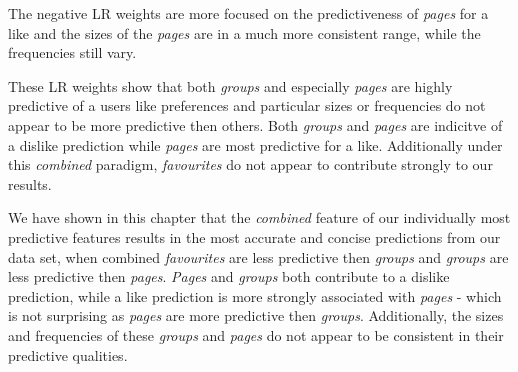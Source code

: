 The negative LR weights are more focused on the predictiveness of \emph{pages} for a like and the sizes of the \emph{pages} are in
a much more consistent range, while the frequencies still vary.

These LR weights show that both \emph{groups} and especially \emph{pages} are highly predictive of a users like preferences and particular 
sizes or frequencies do not appear to be more predictive then others. Both \emph{groups} and \emph{pages} are indicitve of a dislike prediction 
while \emph{pages} are most predictive for a like. Additionally under this \emph{combined} paradigm, \emph{favourites} do not appear 
to contribute strongly to our results.

We have shown in this chapter that the \emph{combined} feature of our individually most predictive features results in the most 
accurate and concise predictions from our data set, when combined \emph{favourites} are less predictive then \emph{groups} and 
\emph{groups} are less predictive then \emph{pages}. \emph{Pages} and \emph{groups} both contribute to a dislike prediction, while a like
prediction is more strongly associated with \emph{pages} - which is not surprising as \emph{pages} are more predictive then \emph{groups}.
Additionally, the sizes and frequencies of these \emph{groups} and \emph{pages} do not appear to be consistent in their predictive qualities.


